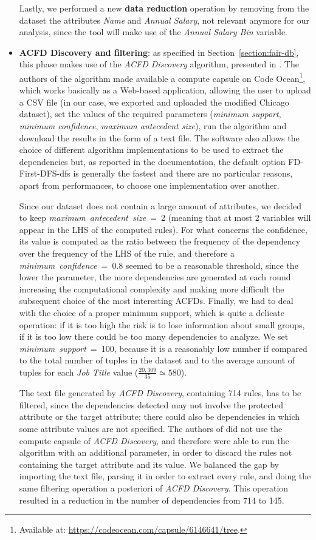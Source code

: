 \begin{itemize}
Lastly, we performed a new \textbf{data reduction} operation by removing from the dataset the attributes \textit{Name} and \textit{Annual Salary}, not relevant anymore for our analysis, since the tool will make use of the \textit{Annual Salary Bin} variable.
\item \textbf{ACFD Discovery and filtering}: as specified in Section~\ref{section:fair-db}, this phase makes use of the \textit{ACFD Discovery} algorithm, presented in \cite{rammelaere2018revisiting}. The authors of the algorithm made available a compute capsule on Code Ocean\footnote{Available at: \url{https://codeocean.com/capsule/6146641/tree}.}, which works basically as a Web-based application, allowing the user to upload a CSV file (in our case, we exported and uploaded the modified Chicago dataset), set the values of the required parameters (\textit{minimum support}, \textit{minimum confidence}, \textit{maximum antecedent size}), run the algorithm and download the results in the form of a text file. The software also allows the choice of different algorithm implementations to be used to extract the dependencies but, as reported in the documentation, the default option FD-First-DFS-dfs is generally the fastest and there are no particular reasons, apart from performances, to choose one implementation over another.

Since our dataset does not contain a large amount of attributes, we decided to keep \textit{maximum~antecedent~size}~=~2 (meaning that at most 2 variables will appear in the LHS of the computed rules).
For what concerns the confidence, its value is computed as the ratio between the frequency of the dependency over the frequency of the LHS of the rule, and therefore a \textit{minimum~confidence}~=~0.8 seemed to be a reasonable threshold, since the lower the parameter, the more dependencies are generated at each round increasing the computational complexity and making more difficult the subsequent choice of the most interesting ACFDs.
Finally, we had to deal with the choice of a proper minimum support, which is quite a delicate operation: if it is too high the risk is to lose information about small groups, if it is too low there could be too many dependencies to analyze. We set \textit{minimum~support}~=~100, because it is a reasonably low number if compared to the total number of tuples in the dataset and to the average amount of tuples for each \textit{Job Title} value (\(\frac{20,309}{35} \simeq 580\)).

The text file generated by \textit{ACFD Discovery}, containing 714 rules, has to be filtered, since the dependencies detected may not involve the protected attribute or the target attribute; there could also be dependencies in which some attribute values are not specified. The authors of \cite{azzalini2021fair} did not use the compute capsule of \textit{ACFD Discovery}, and therefore were able to run the algorithm with an additional parameter, in order to discard the rules not containing the target attribute and its value. We balanced the gap by importing the text file, parsing it in order to extract every rule, and doing the same filtering operation a posteriori of \textit{ACFD Discovery}. This operation resulted in a reduction in the number of dependencies from 714 to 145.


\end{itemize}
